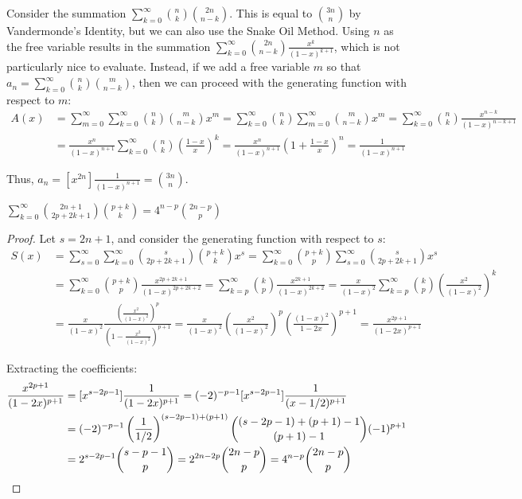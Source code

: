 \documentclass[a4paper]{article}
\begin{document}
\begin{example}
Consider the summation $\sum_{k=0}^\infty\binom nk\binom{2n}{n-k}$. This is equal to $\binom{3n}n$ by Vandermonde's Identity, but we can also use the Snake Oil Method. Using $n$ as the free variable results in the summation $\sum_{k=0}^\infty\binom{2n}{n-k}\frac{x^k}{(1-x)^{k+1}}$, which is not particularly nice to evaluate. Instead, if we add a free variable $m$ so that $a_n=\sum_{k=0}^\infty\binom nk\binom{m}{n-k}$, then we can proceed with the generating function with respect to $m$:
\begin{align*}
A(x)
&=\sum_{m=0}^\infty\sum_{k=0}^\infty\binom nk\binom{m}{n-k}x^m
=\sum_{k=0}^\infty\binom nk\sum_{m=0}^\infty\binom{m}{n-k}x^m
=\sum_{k=0}^\infty\binom nk\frac{x^{n-k}}{(1-x)^{n-k+1}}\\
&=\frac{x^n}{(1-x)^{n+1}}\sum_{k=0}^\infty\binom nk\left(\frac{1-x}x\right)^k
=\frac{x^n}{(1-x)^{n+1}}\left(1+\frac{1-x}x\right)^n
=\frac{1}{(1-x)^{n+1}}
\end{align*}

Thus, $a_{n}=[x^{2n}]\frac{1}{(1-x)^{n+1}}=\binom{3n}n$.
\end{example}

\begin{example}
$\displaystyle\sum_{k=0}^\infty\binom{2n+1}{2p+2k+1}\binom{p+k}k=4^{n-p}\binom{2n-p}{p}$

\begin{hl}
\begin{proof}
Let $s=2n+1$, and consider the generating function with respect to $s$:
\begin{align*}
S(x)
&=
\sum_{s=0}^\infty\sum_{k=0}^\infty\binom{s}{2p+2k+1}\binom{p+k}kx^s
=\sum_{k=0}^\infty\binom{p+k}p\sum_{s=0}^\infty\binom{s}{2p+2k+1}x^s\\
&=\sum_{k=0}^\infty\binom{p+k}p\frac{x^{2p+2k+1}}{(1-x)^{2p+2k+2}}
=\sum_{k=p}^\infty\binom{k}p\frac{x^{2k+1}}{(1-x)^{2k+2}}
=\frac x{(1-x)^2}\sum_{k=p}^\infty\binom{k}p\left(\frac{x^{2}}{(1-x)^{2}}\right)^k\\
&=\frac x{(1-x)^2}\frac{\left(\frac{x^{2}}{(1-x)^{2}}\right)^{p}}{\left(1-\frac{x^{2}}{(1-x)^{2}}\right)^{p+1}}
=\frac x{(1-x)^2}\left(\frac{x^{2}}{(1-x)^{2}}\right)^{p}\left(\frac{(1-x)^{2}}{1-2x}\right)^{p+1}
= \frac{x^{2p+1}}{(1-2x)^{p+1}}
\end{align*}

Extracting the coefficients:
\begin{align*}
[x^s]\frac{x^{2p+1}}{(1-2x)^{p+1}}
&=[x^{s-2p-1}]\frac{1}{(1-2x)^{p+1}}
=(-2)^{-p-1}[x^{s-2p-1}]\frac{1}{(x-1/2)^{p+1}}\\
&=(-2)^{-p-1}\left(\frac1{1/2}\right)^{(s-2p-1)+(p+1)}\binom{(s-2p-1)+(p+1)-1}{(p+1)-1}(-1)^{p+1}\\
&=2^{s-2p-1}\binom{s-p-1}{p}
=2^{2n-2p}\binom{2n-p}{p}
=4^{n-p}\binom{2n-p}p\qedhere
\end{align*}
\end{proof}
\end{hl}
\end{example}
\end{document}
